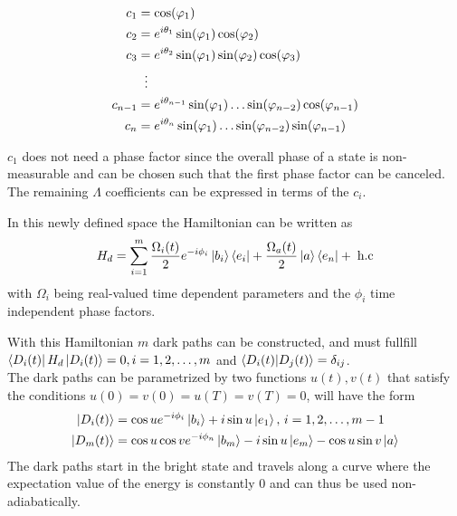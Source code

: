 \begin{equation}
\begin{aligned}
c_1 &= \cos(\varphi_1)
\\ 
c_2 &= e^{i\theta_1}\sin(\varphi_1)\cos(\varphi_2)
\\ 
c_3 &= e^{i\theta_2}\sin(\varphi_1)\sin(\varphi_2)\cos(\varphi_3)
\\
&\hspace{2mm}\vdots
\\
c_{n-1} &= e^{i\theta_{n-1}}\sin(\varphi_1)\dots\sin(\varphi_{n-2})\cos(\varphi_{n-1})
\\
c_{n} &= e^{i\theta_{n}}\sin(\varphi_1)\dots\sin(\varphi_{n-2})\sin(\varphi_{n-1})
\end{aligned}
\end{equation}

$c_1$ does not need a phase factor since the overall phase of a state is non-measurable and can be chosen such that the first phase factor can be canceled. The remaining $\Lambda$ coefficients can be expressed in terms of the $c_i$.

In this newly defined space the Hamiltonian can be written as
\begin{equation}
H_d = \sum_{i = 1}^m \frac{\Omega_i(t)}{2}e^{-i\phi_i}\ket{b_i}\bra{e_i} + \frac{\Omega_a(t)}{2}\ket{a}\bra{e_n} +\;\text{h.c}
\label{eq:HamdN}
\end{equation}
with $\Omega_i$ being real-valued time dependent parameters and the $\phi_i$ time independent phase factors.

With this Hamiltonian $m$ dark paths can be constructed, and must fullfill $\bra{D_i(t)}H_d\ket{D_i(t)} = 0, i = 1,2,\dots,m$ and $\bra{D_i(t)}\ket{D_j(t)} = \delta_{ij}$.\\
The dark paths can be parametrized by two functions $u(t),v(t)$ that satisfy the conditions $u(0) = v(0) = u(T) = v(T) = 0$,  will have the form
\begin{equation}
\begin{aligned}
\ket{D_i(t)} &= \cos u e^{-i\phi_i}\ket{b_i} + i\sin u \ket{e_1},\, i = 1,2,\dots,m-1
\\
\ket{D_m(t)} &= \cos u \cos v e^{-i\phi_n}\ket{b_m} - i\sin u \ket{e_m} - \cos u \sin v \ket{a}
\end{aligned}
\end{equation}
The dark paths start in the bright state and travels along a curve where the expectation value of the energy is constantly $0$ and can thus be used non-adiabatically.

